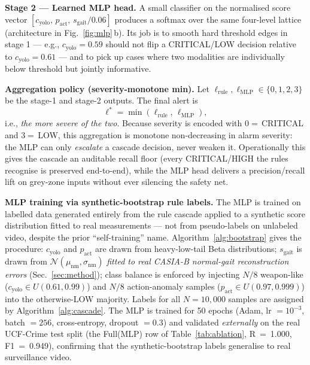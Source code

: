 \documentclass[runningheads]{llncs}
\begin{document}
\textbf{Stage 2 --- Learned MLP head.} A small classifier on the normalised score vector $[c_\text{yolo},\,p_\text{act},\,s_\text{gait}/0.06]$ produces a softmax over the same four-level lattice (architecture in Fig.~\ref{fig:mlp}\,b). Its job is to smooth hard threshold edges in stage 1 --- e.g., $c_\text{yolo} = 0.59$ should not flip a CRITICAL/LOW decision relative to $c_\text{yolo} = 0.61$ --- and to pick up cases where two modalities are individually below threshold but jointly informative.

\textbf{Aggregation policy (severity-monotone min).} Let $\ell_\text{rule}, \ell_\text{MLP} \in \{0,1,2,3\}$ be the stage-1 and stage-2 outputs. The final alert is
\begin{equation}
  \ell^* = \min(\ell_\text{rule},\,\ell_\text{MLP}),
  \label{eq:agg}
\end{equation}
i.e., \emph{the more severe of the two}. Because severity is encoded with $0=$\,CRITICAL and $3=$\,LOW, this aggregation is monotone non-decreasing in alarm severity: the MLP can only \emph{escalate} a cascade decision, never weaken it. Operationally this gives the cascade an auditable recall floor (every CRITICAL/HIGH the rules recognise is preserved end-to-end), while the MLP head delivers a precision/recall lift on grey-zone inputs without ever silencing the safety net.

\textbf{MLP training via synthetic-bootstrap rule labels.} The MLP is trained on labelled data generated entirely from the rule cascade applied to a synthetic score distribution fitted to real measurements --- not from pseudo-labels on unlabeled video, despite the prior ``self-training'' name. Algorithm~\ref{alg:bootstrap} gives the procedure: $c_\text{yolo}$ and $p_\text{act}$ are drawn from heavy-low-tail Beta distributions; $s_\text{gait}$ is drawn from $\mathcal{N}(\mu_\text{nm},\sigma_\text{nm})$ \emph{fitted to real CASIA-B normal-gait reconstruction errors} (Sec.~\ref{sec:method}); class balance is enforced by injecting $N/8$ weapon-like ($c_\text{yolo}\in U(0.61,0.99)$) and $N/8$ action-anomaly samples ($p_\text{act}\in U(0.97,0.999)$) into the otherwise-LOW majority. Labels for all $N=10{,}000$ samples are assigned by Algorithm~\ref{alg:cascade}. The MLP is trained for 50 epochs (Adam, lr $=10^{-3}$, batch $=256$, cross-entropy, dropout $=0.3$) and validated \emph{externally} on the real UCF-Crime test split (the Full(MLP) row of Table~\ref{tab:ablation}, R~=~1.000, F1~=~0.949), confirming that the synthetic-bootstrap labels generalise to real surveillance video.
\end{document}
